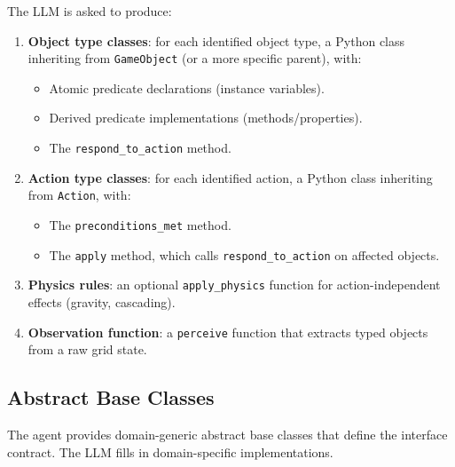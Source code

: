 \documentclass{article}
\begin{document}
The LLM is asked to produce:
\begin{enumerate}[nosep]
    \item \textbf{Object type classes}: for each identified object type,
          a Python class inheriting from \texttt{GameObject} (or a more
          specific parent), with:
          \begin{itemize}[nosep]
              \item Atomic predicate declarations (instance variables).
              \item Derived predicate implementations (methods/properties).
              \item The \texttt{respond\_to\_action} method.
          \end{itemize}
    \item \textbf{Action type classes}: for each identified action, a Python
          class inheriting from \texttt{Action}, with:
          \begin{itemize}[nosep]
              \item The \texttt{preconditions\_met} method.
              \item The \texttt{apply} method, which calls
                    \texttt{respond\_to\_action} on affected objects.
          \end{itemize}
    \item \textbf{Physics rules}: an optional \texttt{apply\_physics} function
          for action-independent effects (gravity, cascading).
    \item \textbf{Observation function}: a \texttt{perceive} function that
          extracts typed objects from a raw grid state.
\end{enumerate}

\subsection{Abstract Base Classes}
\label{sec:abc}

The agent provides domain-generic abstract base classes that define the
interface contract.  The LLM fills in domain-specific implementations.
\end{document}
